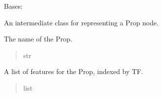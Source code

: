 \documentclass[letterpaper,10pt,english]{sphinxmanual}
\begin{document}
\begin{fulllineitems}
\label{\detokenize{nodes:nodes.nodeBuilder.Prop}}
\pysigstartsignatures
\pysiglinewithargsret
{}
{\sphinxparamcomma {}\sphinxparamcomma {}}
{}
\pysigstopsignatures
\sphinxAtStartPar
Bases: {\hyperref[\detokenize{nodes:nodes.nodeBuilder.Token}]{}}

\sphinxAtStartPar
An intermediate class for representing a Prop node.

\begin{fulllineitems}
\label{\detokenize{nodes:nodes.nodeBuilder.Prop.name}}
\pysigstartsignatures
\pysigline
{}
\pysigstopsignatures
\sphinxAtStartPar
The name of the Prop.
\begin{quote}\begin{description}
\sphinxAtStartPar
str

\end{description}\end{quote}

\end{fulllineitems}


\begin{fulllineitems}
\label{\detokenize{nodes:nodes.nodeBuilder.Prop.features}}
\pysigstartsignatures
\pysigline
{}
\pysigstopsignatures
\sphinxAtStartPar
A list of features for the Prop, indexed by TF.
\begin{quote}\begin{description}
\sphinxAtStartPar
list

\end{description}\end{quote}

\end{fulllineitems}



\end{fulllineitems}
\end{document}
